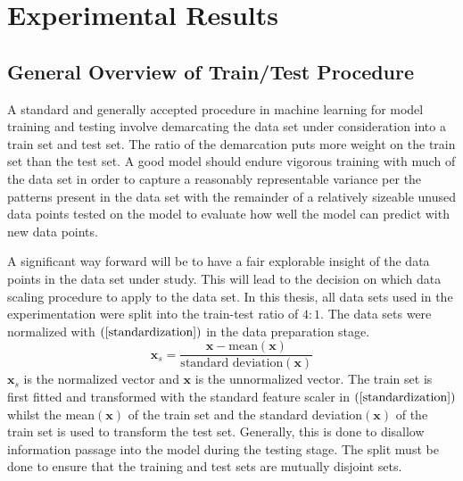 \documentclass[english]{HSMW-Thesis}
\begin{document}
\chapter{Experimental Results}

\section{General Overview of Train/Test Procedure }
A standard and generally accepted procedure in machine learning for model training and testing involve demarcating the data set under consideration into a train set and test set. The ratio of the demarcation puts more weight on the train set than the test set. A good model should endure vigorous training with much of the data set in order to capture a reasonably representable variance per the patterns present in the data set with the remainder of a relatively sizeable unused data points tested on the model to evaluate how well the model can predict with new data points.

A significant way forward will be to have a fair explorable insight of the data points in the data set under study. This will lead to the decision on which data scaling procedure to apply to the data set.
In this thesis, all data sets used in the experimentation were split into the train-test ratio of $4:1$. The data sets were normalized  with  $\left( \ref{standardization}\right)$ in the data preparation stage.
\begin{equation}\label{standardization}
	\mathbf{x}_{s}=\frac{\mathbf{x}-\text{mean}(\mathbf{x})}{\text{standard deviation}(\mathbf{x})}
\end{equation} 
$\mathbf{x}_{s}$\hspace{2pt} is the normalized vector and \hspace{2pt}$\mathbf{x}$\hspace{2pt} is the unnormalized vector.
The train set is first fitted and transformed with the standard feature scaler in  $\left( \ref{standardization} \right) $  whilst the mean$\left(\mathbf{x} \right)$ \hspace{2pt}of the train set  and the standard deviation$\left(\mathbf{x}\right)$  of the train set is used to transform the test set. Generally, this is done to disallow information passage into the model during the testing stage.
The split must be done to ensure that the training and test sets are mutually disjoint sets.
\end{document}
